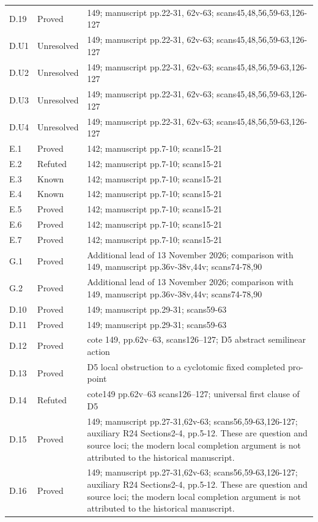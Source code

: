 {\begin{longtable}{p{1.9cm}p{1.7cm}p{10.3cm}}
D.19 & Proved & 149; manuscript pp.22-31, 62v-63; scans45,48,56,59-63,126-127 \\
D.U1 & Unresolved & 149; manuscript pp.22-31, 62v-63; scans45,48,56,59-63,126-127 \\
D.U2 & Unresolved & 149; manuscript pp.22-31, 62v-63; scans45,48,56,59-63,126-127 \\
D.U3 & Unresolved & 149; manuscript pp.22-31, 62v-63; scans45,48,56,59-63,126-127 \\
D.U4 & Unresolved & 149; manuscript pp.22-31, 62v-63; scans45,48,56,59-63,126-127 \\
E.1 & Proved & 142; manuscript pp.7-10; scans15-21 \\
E.2 & Refuted & 142; manuscript pp.7-10; scans15-21 \\
E.3 & Known & 142; manuscript pp.7-10; scans15-21 \\
E.4 & Known & 142; manuscript pp.7-10; scans15-21 \\
E.5 & Proved & 142; manuscript pp.7-10; scans15-21 \\
E.6 & Proved & 142; manuscript pp.7-10; scans15-21 \\
E.7 & Proved & 142; manuscript pp.7-10; scans15-21 \\
G.1 & Proved & Additional lead of 13 November 2026; comparison with 149, manuscript pp.36v-38v,44v; scans74-78,90 \\
G.2 & Proved & Additional lead of 13 November 2026; comparison with 149, manuscript pp.36v-38v,44v; scans74-78,90 \\
D.10 & Proved & 149; manuscript pp.29-31; scans59-63 \\
D.11 & Proved & 149; manuscript pp.29-31; scans59-63 \\
D.12 & Proved & cote 149, pp.62v--63, scans126--127; D5 abstract semilinear action \\
D.13 & Proved & D5 local obstruction to a cyclotomic fixed completed pro-point \\
D.14 & Refuted & cote149 pp.62v--63 scans126--127; universal first clause of D5 \\
D.15 & Proved & 149; manuscript pp.27-31,62v-63; scans56,59-63,126-127; auxiliary R24 Sections2-4, pp.5-12. These are question and source loci; the modern local completion argument is not attributed to the historical manuscript. \\
D.16 & Proved & 149; manuscript pp.27-31,62v-63; scans56,59-63,126-127; auxiliary R24 Sections2-4, pp.5-12. These are question and source loci; the modern local completion argument is not attributed to the historical manuscript. \\

\end{longtable}}
